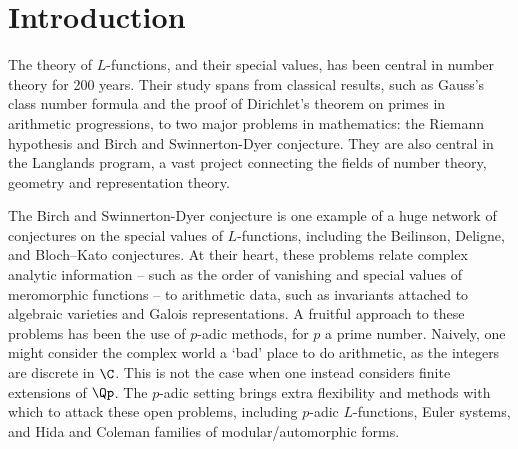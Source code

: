 \documentclass[a4paper,10pt, english, reqno]{smfart}
\numberwithin{equation}{section}
\begin{document}
\footnotesize
\tableofcontents
\normalsize




\section{Introduction}\label{sec:intro}
The theory of $L$-functions, and their special values, has been central in number theory for 200 years. Their study spans from classical results, such as Gauss's class number formula and the proof of Dirichlet's theorem on primes in arithmetic progressions, to two major problems in mathematics: the Riemann hypothesis and Birch and Swinnerton-Dyer conjecture. They are also central in the Langlands program, a vast project connecting the fields of number theory, geometry and representation theory.

The Birch and Swinnerton-Dyer conjecture is one example of a huge network of conjectures on the special values of $L$-functions, including the Beilinson, Deligne, and Bloch--Kato conjectures. At their heart, these problems relate complex analytic information -- such as the order of vanishing and special values of meromorphic functions -- to arithmetic data, such as invariants attached to algebraic varieties and Galois representations. A fruitful approach to these problems has been the use of $p$-adic methods, for $p$ a prime number. Naively, one might consider the complex world a `bad' place to do arithmetic, as the integers are discrete in $\C$. This is not the case when one instead considers finite extensions of $\Qp$. The $p$-adic setting brings extra flexibility and methods with which to attack these open problems, including $p$-adic $L$-functions, Euler systems, and Hida and Coleman families of modular/automorphic forms. %

\end{document}
